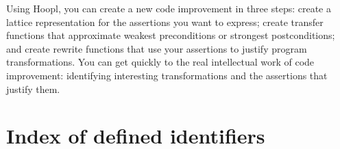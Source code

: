 \documentclass[blockstyle,preprint,natbib,nocopyrightspace]{sigplanconf}
\newcommand\ourlib{Hoopl}  %
\newcommand\secref[1]{Section~\ref{sec:#1}}
\begin{document}
%
%
Using \ourlib,
you can create a new code improvement in three steps:
create a lattice representation for the assertions you want to
express;
create transfer functions that approximate weakest preconditions or
strongest postconditions;
and 
create rewrite functions that use your assertions to justify
program transformations.  
You can get quickly to the real 
intellectual work of code improvement: identifying interesting
transformations and the assertions that justify them.

\makeatother

\providecommand\includeftpref{\relax} %



\clearpage

\appendix

\section{Index of defined identifiers}

\newcommand\dropit[3][]{}

\newcommand\hsprelude[2]{\noindent
  \texttt{#1} defined in the Haskell Prelude\\}
\let\hsprelude\dropit
\end{document}
